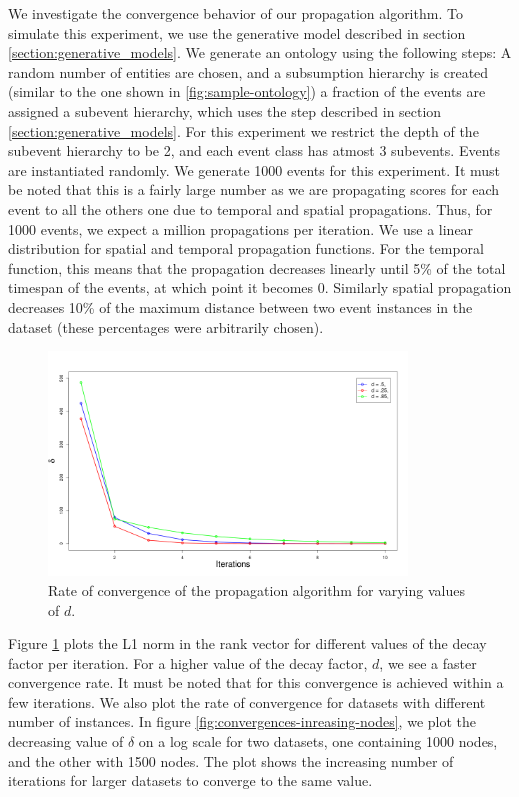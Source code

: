 We investigate the convergence behavior of our propagation algorithm. To simulate this experiment, we use the generative model described in section \ref{section:generative_models}. We generate an ontology using the following steps: A random number of entities are chosen, and a subsumption hierarchy is created (similar to the one shown in \ref{fig:sample-ontology}) a fraction of the events are assigned a subevent hierarchy, which uses the step described in section \ref{section:generative_models}. For this experiment we restrict the depth of the subevent hierarchy to be 2, and each event class has atmost 3 subevents. Events are instantiated randomly. We generate 1000 events for this experiment. It must be noted that this is a fairly large number as we are propagating scores for each event to all the others one due to temporal and spatial propagations. Thus, for 1000 events, we expect a million propagations per iteration. We use a linear distribution for spatial and temporal propagation functions. For the temporal function, this means that the propagation decreases linearly until 5\% of the total timespan of the events, at which point it becomes 0. Similarly spatial propagation decreases 10\% of the maximum distance between two event instances in the dataset (these percentages were arbitrarily chosen).

\begin{figure}[h!]
\centering
\includegraphics[width=0.85\textwidth]{media/chapter6/convergences.png}
\caption{Rate of convergence of the propagation algorithm for varying values of $d$.}
\label{fig:convergences}
\end{figure}

Figure \ref{fig:convergences} plots the L1 norm in the rank vector for different values of the decay factor per iteration. For a higher value of the decay factor, $d$, we see a faster convergence rate. It must be noted that for this convergence is achieved within a few iterations. We also plot the rate of convergence for datasets with different number of instances. In figure \ref{fig:convergences-inreasing-nodes}, we plot the decreasing value of $\delta$ on a log scale for two datasets, one containing 1000 nodes, and the other with 1500 nodes. The plot shows the increasing number of iterations for larger datasets to converge to the same value.

